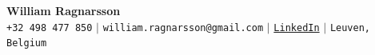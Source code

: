 \documentclass[letterpaper,11pt]{article}
\begin{document}
\begin{center}
    \textbf{\Huge William Ragnarsson} \\ \vspace{5pt}
    \small
    \texttt{+32 498 477 850} \hspace{6pt} $|$ \hspace{6pt}
    \texttt{william.ragnarsson@gmail.com} \hspace{6pt} $|$ \hspace{6pt}
    \href{https://www.linkedin.com/in/william-ragnarsson/}{\texttt{LinkedIn}} \hspace{6pt} $|$ \hspace{6pt}
    \texttt{Leuven, Belgium}
\end{center}






\end{document}
